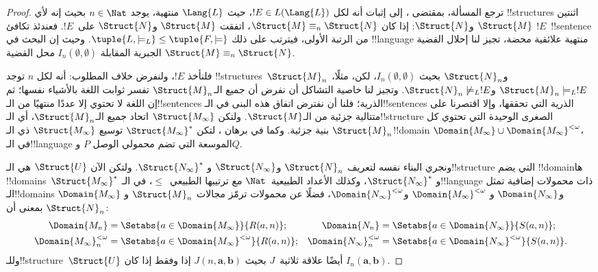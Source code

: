 \documentclass[../../../include/open-logic-section]{subfiles}
\begin{document}
\begin{proof}
ترجع المسألة، بمقتضى ، إلى إثبات أنه لكل
$!E \in L(\Lang{L})$، حيث $\Lang{L}$ منتهية، يوجد $n \in \Nat$ بحيث
إنه لأي !!{structure}s اثنتين $\Struct{M}$ و$\Struct{N}$: إذا كان
$\Struct{M} \equiv_n \Struct{N}$، اتفقت $\Struct{M}$ و$\Struct{N}$
على~$!E$. فعندئذ تكافئ $!E$~!!{sentence} من الرتبة الأولى، فيترتب على ذلك
$\tuple{L,\models_L} \le \tuple{F,\models}$. وحيث إن البحث في
!!{language} منتهية علائقية محضة، تجيز لنا
 إحلال القضية الجبرية المقابلة
$I_n(\emptyset,\emptyset)$ محل القضية
$\Struct{M} \equiv_n \Struct{N}$.

فلنأخذ $!E$، ولنفرض خلاف المطلوب: أنه لكل $n$ توجد
!!{structure}s~$\Struct{M}_n$ و$\Struct{N}_n$ بحيث
$I_n(\emptyset,\emptyset)$، لكن، مثلًا،
$\Struct{M}_n \models_L !E$ و$\Struct{N}_n \not\models_L !E$. وتجيز لنا خاصية
التشاكل أن نفرض أن جميع الـ$\Struct{M}_n$ تفسر ثوابت اللغة
بالأشياء نفسها؛ ثم إن اللغة لا تحتوي إلا عددًا منتهيًا من
الـ!!{sentence}s الذرية؛ فلنا أن نفترض اتفاق هذه البنى في الـ!!{sentence}s الذرية
التي تحققها، وإلا اقتصرنا على متتالية جزئية من الـ$\Struct{M}$. ولتكن
$\Struct{M_\infty}$ اتحاد جميع الـ$\Struct{M}_n$، أي الـ!!{structure}
الصغرى الوحيدة التي تحتوي كل $\Struct{M}_n$ بنية جزئية. وكما في برهان
، لتكن $\Struct{M_\infty}^*$ توسيع
$\Struct{M_\infty}$ ذي الـ!!{domain}
$\Domain{M_\infty} \cup \Domain{M_\infty}^{<\omega}$، في
الـ!!{language} الموسعة التي تضم محمولي الوصل $P$ و$Q$.

ونجري البناء نفسه لتعريف $\Struct{N}_n$ و$\Struct{N_\infty}$ و
$\Struct{N_\infty}^*$. ولتكن الآن $\Struct{U}$ هي الـ!!{structure} التي
يضم !!{domain}ها !!{domain}s~$\Struct{M_\infty}^*$ و
$\Struct{N_\infty}^*$، وكذلك الأعداد الطبيعية~$\Nat$ مع ترتيبها
الطبيعي~$\le$، في الـ!!{language} ذات محمولات إضافية تمثل الـ!!{domain}s
$\Domain{M_\infty}$ و$\Domain{N_\infty}$ و
$\Domain{M_\infty}^{<\omega}$ و$\Domain{N_\infty}^{<\omega}$، فضلًا
عن محمولات ترمّز مجالات $\Struct{M}_n$ و$\Struct{N}_n$ بمعنى أن:
\begin{align*}
  \Domain{M_n} & = \Setabs{a \in \Domain{M_\infty}}{R(a, n)}; &
  \Domain{N_n} & = \Setabs{a \in \Domain{N_\infty}}{S(a,n)}; \\
  \Domain{M_\infty}^{<\omega}_n & = \Setabs{a \in \Domain{M_\infty}^{<\omega}}{R(a,n)}; &
  \Domain{N_\infty}^{<\omega}_n & = \Setabs{a \in \Domain{N_\infty}^{<\omega}}{S(a,n)}.
\end{align*}
وللـ!!{structure}~$\Struct{U}$ أيضًا علاقة ثلاثية~$J$ بحيث
$J(n,\mathbf{a},\mathbf{b})$ إذا وفقط إذا كان
$I_n(\mathbf{a},\mathbf{b})$.


\end{proof}
\end{document}
